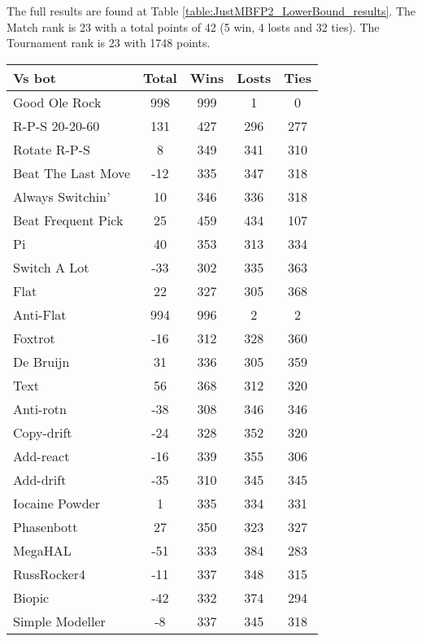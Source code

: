 The full results are found at Table \ref{table:JustMBFP2_LowerBound_results}. The Match rank is 23 with a total points of 42 (5 win, 4 losts and 32 ties). The Tournament rank is 23 with 1748 points.

\begin{table*}
    \caption{MBFP\textsubscript{1} and MBFP\textsubscript{2} Lower Bound results}
    \label{table:JustMBFP2_LowerBound_results}
    \centering
    \begin{tabular}{|l|c|c|c|c|}
        \hline
        \textbf{Vs bot} & \textbf{Total} & \textbf{Wins} & \textbf{Losts} & \textbf{Ties} \\ \hline
Good Ole Rock & 998 & 999 & 1 & 0 \\ \hline 
R-P-S 20-20-60 & 131 & 427 & 296 & 277 \\ \hline 
Rotate R-P-S & 8 & 349 & 341 & 310 \\ \hline 
Beat The Last Move & -12 & 335 & 347 & 318 \\ \hline 
Always Switchin' & 10 & 346 & 336 & 318 \\ \hline 
Beat Frequent Pick & 25 & 459 & 434 & 107 \\ \hline 
Pi & 40 & 353 & 313 & 334 \\ \hline 
Switch A Lot & -33 & 302 & 335 & 363 \\ \hline 
Flat & 22 & 327 & 305 & 368 \\ \hline 
Anti-Flat & 994 & 996 & 2 & 2 \\ \hline 
Foxtrot & -16 & 312 & 328 & 360 \\ \hline 
De Bruijn & 31 & 336 & 305 & 359 \\ \hline 
Text & 56 & 368 & 312 & 320 \\ \hline 
Anti-rotn & -38 & 308 & 346 & 346 \\ \hline 
Copy-drift & -24 & 328 & 352 & 320 \\ \hline 
Add-react & -16 & 339 & 355 & 306 \\ \hline 
Add-drift & -35 & 310 & 345 & 345 \\ \hline 
Iocaine Powder & 1 & 335 & 334 & 331 \\ \hline 
Phasenbott & 27 & 350 & 323 & 327 \\ \hline 
MegaHAL & -51 & 333 & 384 & 283 \\ \hline 
RussRocker4 & -11 & 337 & 348 & 315 \\ \hline 
Biopic & -42 & 332 & 374 & 294 \\ \hline 
Simple Modeller & -8 & 337 & 345 & 318 \\ \hline 

\end{tabular}
\end{table*}
